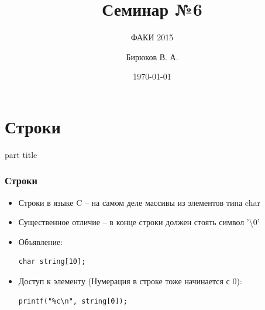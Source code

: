 \documentclass[14pt,pdf,hyperref={unicode}]{beamer}
\title{Семинар №6}
\subtitle{ФАКИ 2015}
\author{Бирюков В. А.}
\date{\today}
\begin{document}
\lstset{language=C}

\begin{frame}
\titlepage
\end{frame} 








\section{Строки}
\begin{frame}
\begin{center}
\begin{beamercolorbox}[sep=8pt,center]{part
title}
\insertsection
\end{beamercolorbox}
\end{center}
\end{frame}


\begin{frame}[fragile]
\frametitle{Строки} 
\begin{itemize}
\item Строки в языке C -- на самом деле массивы из элементов типа char
\item Существенное отличие -- в конце строки должен стоять символ '\textbackslash 0'
\item Объявление:
\begin{lstlisting}
char string[10];
\end{lstlisting}
\item Доступ к элементу
(Нумерация в строке тоже начинается с 0):\\
\begin{lstlisting}
printf("%c\n", string[0]);
\end{lstlisting}
\end{itemize}
\end{frame}
\end{document}
